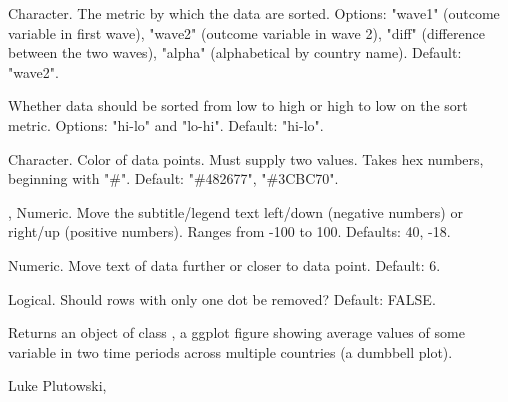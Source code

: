 \documentclass[a4paper]{book}
\begin{document}
\begin{Arguments}
\begin{ldescription}
\item[\code{sort}] Character.  The metric by which the data are sorted.  Options: "wave1" (outcome variable in first wave), "wave2" (outcome
variable in wave 2), "diff" (difference between the two waves), "alpha" (alphabetical by country name).
Default: "wave2".

\item[\code{order}] Whether data should be sorted from low to high or high to low on the sort metric.  Options: "hi-lo" and "lo-hi".
Default: "hi-lo".

\item[\code{color\_scheme}] Character.  Color of data points.  Must supply two values.  Takes hex numbers, beginning with "\#".
Default: "\#482677", "\#3CBC70".

\item[\code{subtitle\_h\_just}, \code{subtitle\_v\_just}] Numeric.  Move the subtitle/legend text left/down (negative numbers) or right/up (positive numbers).
Ranges from -100 to 100.  Defaults: 40, -18.

\item[\code{text\_nudge}] Numeric.  Move text of data further or closer to data point.  Default: 6.

\item[\code{drop\_singles}] Logical.  Should rows with only one dot be removed?  Default: FALSE.
\end{ldescription}
\end{Arguments}
%
\begin{Value}
Returns an object of class , a ggplot figure showing
average values of some variable in two time periods across multiple countries
(a dumbbell plot).
\end{Value}
%
\begin{Author}
Luke Plutowski, 
\end{Author}
%
\end{document}
